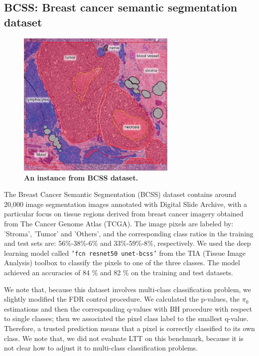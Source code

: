 \documentclass{article}
\begin{document}
\subsection{BCSS: Breast cancer semantic segmentation dataset}

\begin{figure}[h!]
	\centering
	\includegraphics[width=3in]{img/bcss_instance.jpeg}
	\caption{{\bf An instance from BCSS dataset.}}
	\label{fig:bcss_example}
\end{figure} 

The Breast Cancer Semantic Segmentation (BCSS) dataset \cite{Amgad2019StructuredCE} contains around 20,000 image segmentation images annotated with Digital Slide Archive, with a particular focus on tissue regions derived from breast cancer imagery obtained from The Cancer Genome Atlas (TCGA). The image pixels are labeled by: 'Stroma', 'Tumor' and 'Others', and the corresponding class ratios in the training and test sets are: 56\%-38\%-6\% and 33\%-59\%-8\%, respectively. We used the deep learning model called \texttt{'fcn resnet50 unet-bcss'} from the TIA (Tissue Image Analysis) toolbox \cite{Pocock2022} to classify the pixels to one of the three classes. The model achieved an accuracies of 84 \% and 82 \% on the training and test datasets. 

We note that, because this dataset involves multi-class classification problem, we slightly modified the FDR control procedure. We calculated the p-values, the $\pi_0$ estimations and then the corresponding q-values with BH procedure with respect to single classes; then we associated the pixel class label to the smallest q-value. Therefore, a trusted prediction means that a pixel is correctly classified to its own class. We note that, we did not evaluate LTT on this benchmark, because it is not clear how to adjust it to multi-class classification problems.
\end{document}
